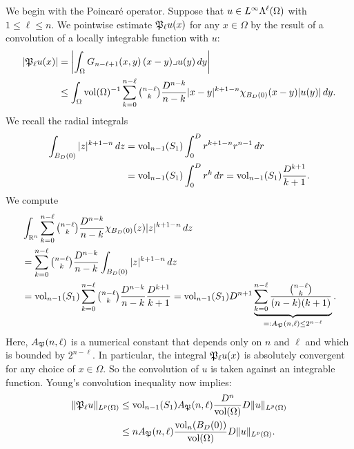 \documentclass[10pt,letterpaper]{article}
\begin{document}
We begin with the Poincar\'e operator. 
Suppose that $u \in L^{\infty}\Lambda^{\ell}(\Omega)$ with $1 \leq \ell \leq n$.
We pointwise estimate ${\mathfrak P}_{\ell} u(x)$ for any $x \in \Omega$ by the result of a convolution of a locally integrable function with $u$:
\begin{align*}
    \left| {\mathfrak P}_{\ell} u(x) \right|
    &=
    \left| 
        \int_{\Omega} G_{n-\ell+1}(x,y) \,(x-y)\lrcorner u(y)\,dy
    \right| 
    \\&\leq 
    \int_{\Omega} \operatorname{vol}(\Omega)^{-1} \sum_{k=0}^{ n-\ell }\tbinom{ n-\ell }{k} \frac{ D^{n-k} }{n-k} |x-y|^{k+1-n} \chi_{B_D(0)}(x-y) |u(y)| \,dy
    .
\end{align*}
We recall the radial integrals 
\begin{align*}
    \int_{B_D(0)} |z|^{k+1-n} \,dz
    &
    =
    \operatorname{vol}_{n-1}(S_1) \int_{0}^{D} r^{k+1-n} r^{n-1} \,dr
    \\&
    =
    \operatorname{vol}_{n-1}(S_1) \int_{0}^{D} r^{k} \,dr
    =
    \operatorname{vol}_{n-1}(S_1) \frac{D^{k+1}}{k+1}
    .
\end{align*}
We compute 
\begin{align*}
    &
    \int_{{\mathbb R}^{n}} \sum_{k=0}^{n-\ell} \tbinom{n-\ell}{k} \frac{ D^{n-k} }{n-k} \chi_{B_D(0)}(z) |z|^{k+1-n} \,dz
    \\&
    =
    \sum_{k=0}^{n-\ell} \tbinom{n-\ell}{k} \frac{ D^{n-k} }{n-k} \int_{B_D(0)} |z|^{k+1-n} \,dz
    \\&
    =
    \operatorname{vol}_{n-1}(S_1) \sum_{k=0}^{n-\ell} \tbinom{n-\ell}{k} \frac{ D^{n-k} }{n-k} \frac{D^{k+1}}{k+1}
    =
    \operatorname{vol}_{n-1}(S_1) D^{n+1} \underbrace{ \sum_{k=0}^{n-\ell} \frac{ \tbinom{n-\ell}{k} }{ (n-k)(k+1) } }_{ =: A_{{\mathfrak P}}(n,\ell) \leq 2^{n-\ell}}
    .
\end{align*}
Here, $A_{{\mathfrak P}}(n,\ell)$ is a numerical constant that depends only on $n$ and $\ell$ 
and which is bounded by $2^{n-\ell}$. 
In particular, the integral ${\mathfrak P}_{\ell} u(x)$ is absolutely convergent for any choice of $x \in \Omega$. 
So the convolution of $u$ is taken against an integrable function. 
Young's convolution inequality now implies: 
\begin{align*}
    \| {\mathfrak P}_{\ell} u \|_{L^{p}(\Omega)}
    &
    \leq 
    \operatorname{vol}_{n-1}(S_1) A_{{\mathfrak P}}(n,\ell) \frac{ D^{n} }{\operatorname{vol}(\Omega)} 
    D
    \| u \|_{L^{p}(\Omega)}
    \\&
    \leq 
    n A_{{\mathfrak P}}(n,\ell) \frac{ \operatorname{vol}_{n}(B_D(0)) }{\operatorname{vol}(\Omega)} 
    D
    \| u \|_{L^{p}(\Omega)}
    .
\end{align*}
\end{document}
